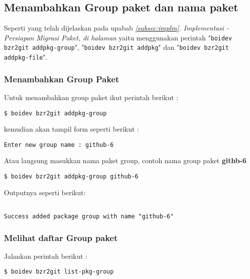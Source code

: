 {\subsection{Menambahkan Group paket dan nama paket}
\label{implm_3}
\noindent
Seperti yang telah dijelaskan pada upabab \textit{\ref{subsec:implm}. Implementasi - \textit{Persiapan Migrasi Paket}, di halaman \pageref{itm:pre_step3}} yaitu menggunakan perintah "\texttt{boidev bzr2git addpkg-group}", "\texttt{boidev bzr2git addpkg}" dan "\texttt{boidev bzr2git addpkg-file}".

\subsubsection{Menambahkan Group Paket}
\label{subsubsec:addpkg-group}
\noindent
Untuk menambahkan group paket ikut perintah berikut :

\begin{lstlisting}[language=ShellBash]
$ boidev bzr2git addpkg-group 
\end{lstlisting}

\noindent
kemudian akan tampil form seperti berikut :

\begin{lstlisting}[language=ShellBash]
Enter new group name : github-6
\end{lstlisting}

\noindent
Atau langsung masukkan nama paket group, contoh nama group paket \textbf{githb-6}

\begin{lstlisting}[language=ShellBash]
$ boidev bzr2git addpkg-group github-6
\end{lstlisting}

\noindent
Outputnya seperti berikut:

\begin{lstlisting}[language=ShellBash]

Success added package group with name "github-6"
\end{lstlisting}

\subsubsection{Melihat daftar Group paket}
\label{subsubsec:list-pkg-group}
\noindent
Jalankan perintah berikut :

\begin{lstlisting}[language=ShellBash]
$ boidev bzr2git list-pkg-group
\end{lstlisting}

}
